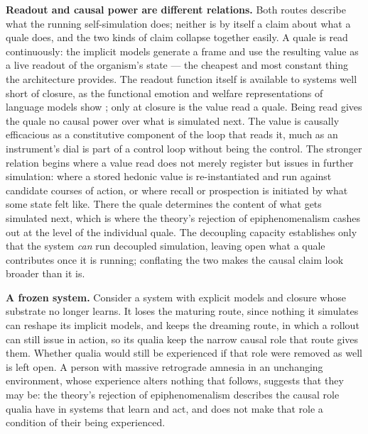 \documentclass[12pt]{article}
\begin{document}
{\textbf{Readout and causal power are different relations.} Both routes describe what the running self-simulation does; neither is by itself a claim about what a quale does, and the two kinds of claim collapse together easily. A quale is read continuously: the implicit models generate a frame and use the resulting value as a live readout of the organism's state --- the cheapest and most constant thing the architecture provides. The readout function itself is available to systems well short of closure, as the functional emotion and welfare representations of language models show \citep{Sofroniew2026,Han2026}; only at closure is the value read a quale. Being read gives the quale no causal power over what is simulated next. The value is causally efficacious as a constitutive component of the loop that reads it, much as an instrument's dial is part of a control loop without being the control. The stronger relation begins where a value read does not merely register but issues in further simulation: where a stored hedonic value is re-instantiated and run against candidate courses of action, or where recall or prospection is initiated by what some state felt like. There the quale determines the content of what gets simulated next, which is where the theory's rejection of epiphenomenalism cashes out at the level of the individual quale. The decoupling capacity establishes only that the system \emph{can} run decoupled simulation, leaving open what a quale contributes once it is running; conflating the two makes the causal claim look broader than it is.

\textbf{A frozen system.} Consider a system with explicit models and closure whose substrate no longer learns. It loses the maturing route, since nothing it simulates can reshape its implicit models, and keeps the dreaming route, in which a rollout can still issue in action, so its qualia keep the narrow causal role that route gives them. Whether qualia would still be experienced if that role were removed as well is left open. A person with massive retrograde amnesia in an unchanging environment, whose experience alters nothing that follows, suggests that they may be: the theory's rejection of epiphenomenalism describes the causal role qualia have in systems that learn and act, and does not make that role a condition of their being experienced.

}
\end{document}
